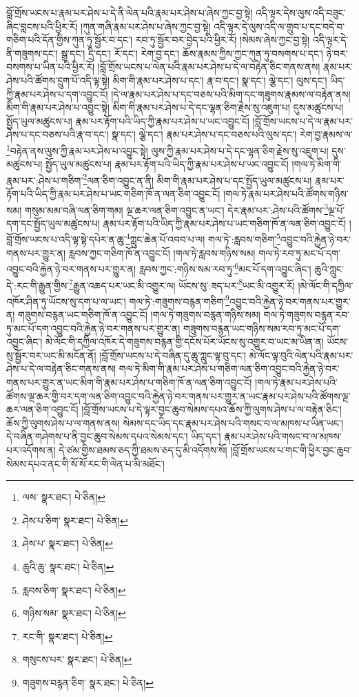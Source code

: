 བློ་གྲོས་ཡངས་པ་རྣམ་པར་ཤེས་པ་དེ་ནི་ལེན་པའི་རྣམ་པར་ཤེས་པ་ཞེས་ཀྱང་བྱ་སྟེ། འདི་ལྟར་དེས་ལུས་འདི་བཟུང་ཞིང་བླངས་པའི་ཕྱིར་རོ། །ཀུན་གཞི་རྣམ་པར་ཤེས་པ་ཞེས་ཀྱང་བྱ་སྟེ། འདི་ལྟར་དེ་ལུས་འདི་ལ་གྲུབ་པ་དང་བདེ་བ་གཅིག་པའི་དོན་གྱིས་ཀུན་ཏུ་སྦྱོར་བ་དང་། རབ་ཏུ་སྦྱོར་བར་བྱེད་པའི་ཕྱིར་རོ། །སེམས་ཞེས་ཀྱང་བྱ་སྟེ། འདི་ལྟར་དེ་ནི་གཟུགས་དང་། སྒྲ་དང་། དྲི་དང་། རོ་དང་། རེག་བྱ་དང་། ཆོས་རྣམས་ཀྱིས་ཀྱང་ཀུན་ཏུ་བསགས་པ་དང་། ཉེ་བར་བསགས་པ་ཡིན་པའི་ཕྱིར་རོ། །བློ་གྲོས་ཡངས་པ་ལེན་པའི་རྣམ་པར་ཤེས་པ་དེ་ལ་བརྟེན་ཅིང་གནས་ནས། རྣམ་པར་ཤེས་པའི་ཚོགས་དྲུག་པོ་འདི་ལྟ་སྟེ། མིག་གི་རྣམ་པར་ཤེས་པ་དང་། རྣ་བ་དང་། སྣ་དང་། ལྕེ་དང་། ལུས་དང་། ཡིད་ཀྱི་རྣམ་པར་ཤེས་པ་དག་འབྱུང་ངོ། །དེ་ལ་རྣམ་པར་ཤེས་པ་དང་བཅས་པའི་མིག་དང་གཟུགས་རྣམས་ལ་བརྟེན་ནས། མིག་གི་རྣམ་པར་ཤེས་པ་འབྱུང་སྟེ། མིག་གི་རྣམ་པར་ཤེས་པ་དེ་དང་ལྷན་ཅིག་རྗེས་སུ་འཇུག་པ། དུས་མཚུངས་པ། སྤྱོད་ཡུལ་མཚུངས་པ། རྣམ་པར་རྟོག་པའི་ཡིད་ཀྱི་རྣམ་པར་ཤེས་པ་ཡང་འབྱུང་ངོ། །བློ་གྲོས་ཡངས་པ་དེ་ལ་རྣམ་པར་ཤེས་པ་དང་བཅས་པའི་རྣ་བ་དང་། སྣ་དང་། ལྕེ་དང་། རྣམ་པར་ཤེས་པ་དང་བཅས་པའི་ལུས་དང་། རེག་བྱ་རྣམས་ལ་\footnote{ལས་  སྣར་ཐང་།  པེ་ཅིན། }བརྟེན་ནས་ལུས་ཀྱི་རྣམ་པར་ཤེས་པ་འབྱུང་སྟེ། ལུས་ཀྱི་རྣམ་པར་ཤེས་པ་དེ་དང་ལྷན་ཅིག་རྗེས་སུ་འཇུག་པ། དུས་མཚུངས་པ། སྤྱོད་ཡུལ་མཚུངས་པ། རྣམ་པར་རྟོག་པའི་ཡིད་ཀྱི་རྣམ་པར་ཤེས་པ་ཡང་འབྱུང་ངོ། །གལ་ཏེ་མིག་གི་རྣམ་པར་:ཤེས་པ་གཅིག་\footnote{ཤེས་པ་ཅིག་  སྣར་ཐང་།  པེ་ཅིན། }ལན་ཅིག་འབྱུང་ན་ནི། མིག་གི་རྣམ་པར་ཤེས་པ་དང་སྤྱོད་ཡུལ་མཚུངས་པ། རྣམ་པར་རྟོག་པའི་ཡིད་ཀྱི་རྣམ་པར་ཤེས་པ་ཡང་གཅིག་ཁོ་ན་ལན་ཅིག་འབྱུང་ངོ། །གལ་ཏེ་རྣམ་པར་ཤེས་པའི་ཚོགས་གཉིས་སམ། གསུམ་མམ་བཞི་ལན་ཅིག་གམ། ལྔ་ཆར་ལན་ཅིག་འབྱུང་ན་ཡང་། དེར་རྣམ་པར་:ཤེས་པའི་ཚོགས་\footnote{ཤེས་པ་  སྣར་ཐང་།  པེ་ཅིན། }ལྔ་པོ་དག་དང་སྤྱོད་ཡུལ་མཚུངས་པ། རྣམ་པར་རྟོག་པའི་ཡིད་ཀྱི་རྣམ་པར་ཤེས་པ་ཡང་གཅིག་ཁོ་ན་ལན་ཅིག་འབྱུང་ངོ། །བློ་གྲོས་ཡངས་པ་འདི་ལྟ་སྟེ་དཔེར་ན་ཆུ་\footnote{ཆུའི་ཆུ་  སྣར་ཐང་།  པེ་ཅིན། }ཀླུང་ཆེན་པོ་འབབ་པ་ལ། གལ་ཏེ་:རླབས་གཅིག་\footnote{རླབས་ཅིག་  སྣར་ཐང་།  པེ་ཅིན། }འབྱུང་བའི་རྐྱེན་ཉེ་བར་གནས་པར་གྱུར་ན། རླབས་ཀྱང་གཅིག་ཁོ་ན་འབྱུང་ངོ། །གལ་ཏེ་རླབས་གཉིས་སམ། གལ་ཏེ་རབ་ཏུ་མང་པོ་དག་འབྱུང་བའི་རྐྱེན་ཉེ་བར་གནས་པར་གྱུར་ན། རླབས་ཀྱང་:གཉིས་སམ་རབ་ཏུ་\footnote{གཉིས་སམ་  སྣར་ཐང་།  པེ་ཅིན། }མང་པོ་དག་འབྱུང་ཞིང་། ཆུའི་ཀླུང་དེ་:རང་གི་རྒྱུན་གྱིས་\footnote{རང་གི་  སྣར་ཐང་།  པེ་ཅིན། }རྒྱུན་འཆད་པར་ཡང་མི་འགྱུར་ལ། ཡོངས་སུ་:ཟད་པར་\footnote{གསུངས་པར་  སྣར་ཐང་།  པེ་ཅིན། }ཡང་མི་འགྱུར་རོ། །མེ་ལོང་གི་དཀྱིལ་འཁོར་ཤིན་ཏུ་ཡོངས་སུ་དག་པ་ལ་ཡང་། གལ་ཏེ་:གཟུགས་བརྙན་གཅིག་\footnote{གཟུགས་བརྙན་ཅིག་  སྣར་ཐང་།  པེ་ཅིན། }འབྱུང་བའི་རྐྱེན་ཉེ་བར་གནས་པར་གྱུར་ན། གཟུགས་བརྙན་ཡང་གཅིག་ཁོ་ན་འབྱུང་ངོ། །གལ་ཏེ་གཟུགས་བརྙན་གཉིས་སམ། གལ་ཏེ་གཟུགས་བརྙན་རབ་ཏུ་མང་པོ་དག་འབྱུང་བའི་རྐྱེན་ཉེ་བར་གནས་པར་གྱུར་ན། གཟུགས་བརྙན་ཡང་གཉིས་སམ་རབ་ཏུ་མང་པོ་དག་འབྱུང་ཞིང་། མེ་ལོང་གི་དཀྱིལ་འཁོར་དེ་གཟུགས་བརྙན་གྱི་དངོས་པོར་ཡོངས་སུ་འགྱུར་བ་ཡང་མ་ཡིན་ན། ཡོངས་སུ་སྦྱོར་བར་ཡང་མི་མངོན་ནོ། །བློ་གྲོས་ཡངས་པ་དེ་བཞིན་དུ་ཆུ་ཀླུང་ལྟ་བུ་དང་། མེ་ལོང་ལྟ་བུའི་ལེན་པའི་རྣམ་པར་ཤེས་པ་དེ་ལ་བརྟེན་ཅིང་གནས་ནས། གལ་ཏེ་མིག་གི་རྣམ་པར་ཤེས་པ་གཅིག་ལན་ཅིག་འབྱུང་བའི་རྐྱེན་ཉེ་བར་གནས་པར་གྱུར་ན་ཡང་མིག་གི་རྣམ་པར་ཤེས་པ་གཅིག་ཁོ་ན་ལན་ཅིག་འབྱུང་ངོ། །གལ་ཏེ་རྣམ་པར་ཤེས་པའི་ཚོགས་ལྔ་ཆར་གྱི་བར་དག་ལན་ཅིག་འབྱུང་བའི་རྐྱེན་ཉེ་བར་གནས་པར་གྱུར་ན་ཡང་རྣམ་པར་ཤེས་པའི་ཚོགས་ལྔ་ཆར་ལན་ཅིག་འབྱུང་ངོ། །བློ་གྲོས་ཡངས་པ་དེ་ལྟར་བྱང་ཆུབ་སེམས་དཔའ་ཆོས་ཀྱི་ལུགས་ཤེས་པ་ལ་བརྟེན་ཅིང་། ཆོས་ཀྱི་ལུགས་ཤེས་པ་ལ་གནས་ནས། སེམས་དང་ཡིད་དང་རྣམ་པར་ཤེས་པའི་གསང་བ་ལ་མཁས་པ་ཡིན་ཡང་། དེ་བཞིན་གཤེགས་པ་ནི་བྱང་ཆུབ་སེམས་དཔའ་སེམས་དང་། ཡིད་དང་། རྣམ་པར་ཤེས་པའི་གསང་བ་ལ་མཁས་པར་འདོགས་ན། དེ་ཙམ་གྱིས་ཐམས་ཅད་ཀྱི་ཐམས་ཅད་དུ་མི་འདོགས་སོ། །བློ་གྲོས་ཡངས་པ་གང་གི་ཕྱིར་བྱང་ཆུབ་སེམས་དཔའ་ནང་གི་སོ་སོ་རང་གི་ལེན་པ་མི་མཐོང་། 